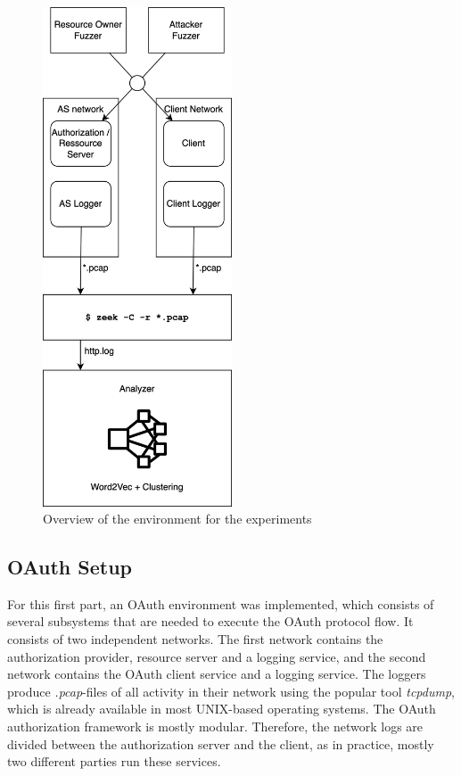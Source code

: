 \begin{figure}[H]
	\sffamily\footnotesize
	\includegraphics[width=0.5\textwidth]{pic/experimental_setup.png}
	\unitlength=0.75mm
	\linethickness{0.4pt}
	\caption{Overview of the environment for the experiments}
	\label{fig:experimental_setup}
\end{figure}

\subsection{OAuth Setup}
For this first part, an OAuth environment was implemented, which consists of several subsystems that are needed to execute the OAuth protocol flow. It consists of two independent networks. The first network contains the authorization provider, resource server and a logging service, and the second network contains the OAuth client service and a logging service. The loggers produce \emph{.pcap}-files of all activity in their network using the popular tool \emph{tcpdump}, which is already available in most UNIX-based operating systems. The OAuth authorization framework is mostly modular. Therefore, the network logs are divided between the authorization server and the client, as in practice, mostly two different parties run these services. 

